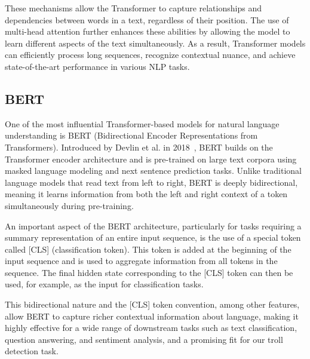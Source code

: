 \documentclass[twoside]{ctuthesis}
\theoremstyle{plain}
\theoremstyle{definition}
\theoremstyle{note}
\begin{document}
These mechanisms allow the Transformer to capture relationships and dependencies between words in a text, regardless of their position. The use of multi-head attention further enhances these abilities by allowing the model to learn different aspects of the text simultaneously. As a result, Transformer models can efficiently process long sequences, recognize contextual nuance, and achieve state-of-the-art performance in various NLP tasks.\par

\subsection{BERT}

One of the most influential Transformer-based models for natural language understanding is BERT (Bidirectional Encoder Representations from Transformers). Introduced by Devlin et al. in 2018~\cite{Devlin2018}, BERT builds on the Transformer encoder architecture and is pre-trained on large text corpora using masked language modeling and next sentence prediction tasks. Unlike traditional language models that read text from left to right, BERT is deeply bidirectional, meaning it learns information from both the left and right context of a token simultaneously during pre-training.\par

An important aspect of the BERT architecture, particularly for tasks requiring a summary representation of an entire input sequence, is the use of a special token called [CLS] (classification token). This token is added at the beginning of the input sequence and is used to aggregate information from all tokens in the sequence. The final hidden state corresponding to the [CLS] token can then be used, for example, as the input for classification tasks.\par

This bidirectional nature and the [CLS] token convention, among other features, allow BERT to capture richer contextual information about language, making it highly effective for a wide range of downstream tasks such as text classification, question answering, and sentiment analysis, and a promising fit for our troll detection task.\par
\end{document}
